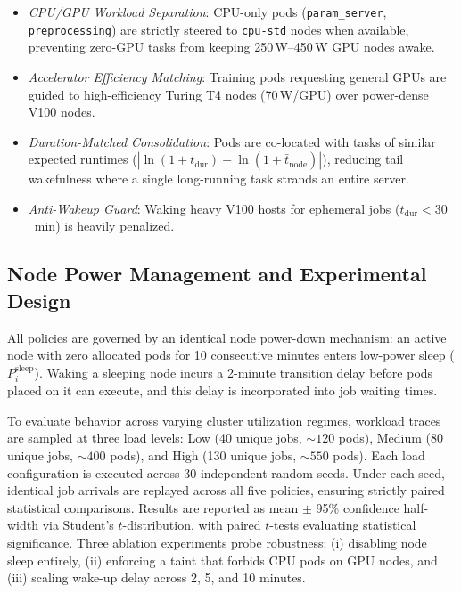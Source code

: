 \documentclass[a4paper,fleqn]{cas-dc}
\begin{document}
\begin{enumerate}[(1)]
\begin{itemize}
    \item \emph{CPU/GPU Workload Separation}: CPU-only pods (\texttt{param\_server}, \texttt{preprocessing}) are strictly steered to \texttt{cpu-std} nodes when available, preventing zero-GPU tasks from keeping 250\,W--450\,W GPU nodes awake.
    \item \emph{Accelerator Efficiency Matching}: Training pods requesting general GPUs are guided to high-efficiency Turing T4 nodes (70\,W/GPU) over power-dense V100 nodes.
    \item \emph{Duration-Matched Consolidation}: Pods are co-located with tasks of similar expected runtimes ($| \ln(1 + t_{\mathrm{dur}}) - \ln(1 + \bar{t}_{\mathrm{node}}) |$), reducing tail wakefulness where a single long-running task strands an entire server.
    \item \emph{Anti-Wakeup Guard}: Waking heavy V100 hosts for ephemeral jobs ($t_{\mathrm{dur}} < 30$~min) is heavily penalized.
\end{itemize}
\end{enumerate}

\subsection{Node Power Management and Experimental Design}
All policies are governed by an identical node power-down mechanism: an active node with zero allocated pods for 10 consecutive minutes enters low-power sleep ($P_i^{\mathrm{sleep}}$). Waking a sleeping node incurs a 2-minute transition delay before pods placed on it can execute, and this delay is incorporated into job waiting times.

To evaluate behavior across varying cluster utilization regimes, workload traces are sampled at three load levels: Low (40 unique jobs, $\sim 120$ pods), Medium (80 unique jobs, $\sim 400$ pods), and High (130 unique jobs, $\sim 550$ pods). Each load configuration is executed across 30 independent random seeds. Under each seed, identical job arrivals are replayed across all five policies, ensuring strictly paired statistical comparisons. Results are reported as mean $\pm$ 95\% confidence half-width via Student's $t$-distribution, with paired $t$-tests evaluating statistical significance. Three ablation experiments probe robustness: (i) disabling node sleep entirely, (ii) enforcing a taint that forbids CPU pods on GPU nodes, and (iii) scaling wake-up delay across 2, 5, and 10 minutes.

\end{document}

